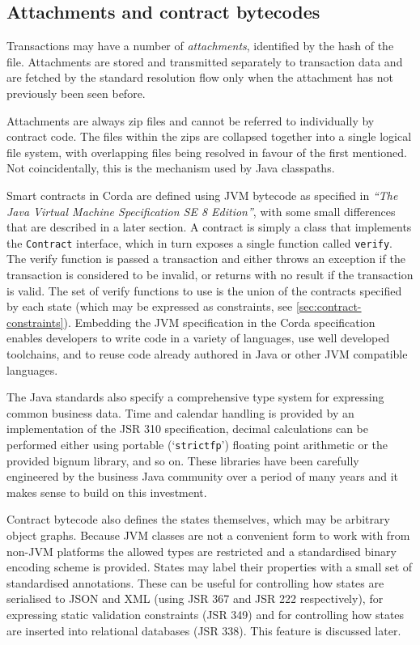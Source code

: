 \documentclass{article}
\begin{document}
\subsection{Attachments and contract bytecodes}

Transactions may have a number of \emph{attachments}, identified by the hash of the file. Attachments are stored
and transmitted separately to transaction data and are fetched by the standard resolution flow only when the
attachment has not previously been seen before.

Attachments are always zip files\cite{ZipFormat} and cannot be referred to individually by contract code. The files
within the zips are collapsed together into a single logical file system, with overlapping files being resolved in
favour of the first mentioned. Not coincidentally, this is the mechanism used by Java classpaths.

Smart contracts in Corda are defined using JVM bytecode as specified in \emph{``The Java Virtual Machine Specification SE 8 Edition''}\cite{JVM},
with some small differences that are described in a later section. A contract is simply a class that implements
the \texttt{Contract} interface, which in turn exposes a single function called \texttt{verify}. The verify
function is passed a transaction and either throws an exception if the transaction is considered to be invalid,
or returns with no result if the transaction is valid. The set of verify functions to use is the union of the contracts
specified by each state (which may be expressed as constraints, see \cref{sec:contract-constraints}). Embedding the
JVM specification in the Corda specification enables developers to write code in a variety of languages, use well
developed toolchains, and to reuse code already authored in Java or other JVM compatible languages.

The Java standards also specify a comprehensive type system for expressing common business data. Time and calendar
handling is provided by an implementation of the JSR 310 specification, decimal calculations can be performed either
using portable (`\texttt{strictfp}') floating point arithmetic or the provided bignum library, and so on. These
libraries have been carefully engineered by the business Java community over a period of many years and it makes
sense to build on this investment.

Contract bytecode also defines the states themselves, which may be arbitrary object graphs. Because JVM classes
are not a convenient form to work with from non-JVM platforms the allowed types are restricted and a standardised
binary encoding scheme is provided. States may label their properties with a small set of standardised annotations.
These can be useful for controlling how states are serialised to JSON and XML (using JSR 367 and JSR 222 respectively),
for expressing static validation constraints (JSR 349) and for controlling how states are inserted into relational
databases (JSR 338). This feature is discussed later.
\end{document}
